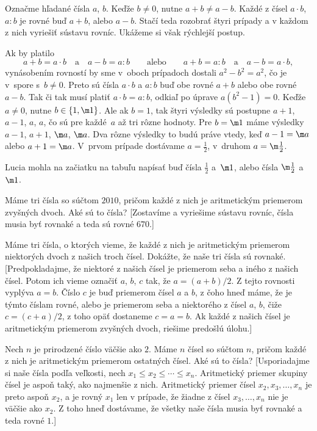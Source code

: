 {%
Označme hľadané čísla $a$, $b$. Keďže $b\ne0$, nutne $a+b\ne a-b$. Každé
z čísel $a\cdot b$, $a:b$ je rovné buď $a+b$, alebo $a-b$. Stačí teda
rozobrať štyri prípady a v každom z nich vyriešiť sústavu rovníc. Ukážeme si však rýchlejší postup.

Ak by platilo
$$
a+b=a\cdot b\quad\text{a}\quad a-b=a:b\qquad\text{alebo}\qquad a+b=a:b\quad\text{a}\quad a-b=a\cdot b,
$$
vynásobením rovností by sme v~oboch prípadoch dostali $a^2-b^2=a^2$, čo je v~spore s~$b\ne0$.
Preto sú čísla $a\cdot b$ a $a:b$ buď obe rovné $a+b$ alebo obe rovné $a-b$. Tak či tak musí platiť $a\cdot b=a:b$, odkiaľ po úprave $a(b^2-1)=0$.
Keďže $a\ne0$, nutne $b\in\{1,\m1\}$. Ale ak $b=1$, tak štyri výsledky sú postupne $a+1$, $a-1$, $a$, $a$,
čo sú pre každé~$a$ až tri rôzne hodnoty. Pre $b=\m1$ máme výsledky $a-1$, $a+1$, $\m a$, $\m a$.
Dva rôzne výsledky to budú práve vtedy, keď $a-1=\m a$ alebo $a+1=\m a$. V~prvom prípade dostávame $a=\frac12$, v~druhom $a=\m\frac12$.

Lucia mohla na začiatku na tabuľu napísať buď čísla $\frac12$ a~$\m1$, alebo čísla $\m\frac12$ a~$\m1$.

Máme tri čísla so súčtom $2010$, pričom každé z nich je aritmetickým priemerom zvyšných dvoch.
Aké sú to čísla?
[Zostavíme a vyriešime sústavu rovníc, čísla musia byť rovnaké a teda sú rovné $670$.]

Máme tri čísla, o ktorých vieme, že každé z nich je aritmetickým priemerom niektorých dvoch
z našich troch čísel. Dokážte, že naše tri čísla sú rovnaké.
[Predpokladajme, že niektoré z našich čísel je priemerom seba a iného z našich čísel. Potom ich vieme
označiť $a$, $b$, $c$ tak, že $a = (a+b)/2$. Z tejto rovnosti vyplýva $a=b$. Číslo $c$ je buď priemerom
čísel $a$ a $b$, z čoho hneď máme, že je týmto číslam rovné, alebo je priemerom seba a niektorého
z čísel $a$, $b$, čiže $c = (c+a)/2$, z toho opäť dostaneme $c=a=b$. Ak každé z našich čísel je
aritmetickým priemerom zvyšných dvoch, riešime predošlú úlohu.]

\D
Nech $n$ je prirodzené číslo väčšie ako $2$. Máme $n$ čísel so súčtom $n$, pričom každé z nich je aritmetickým priemerom
ostatných čísel. Aké sú to čísla?
[Usporiadajme si naše čísla podľa veľkosti, nech $x_1\le x_2\le \cdots\le x_n$. Aritmetický priemer
skupiny čísel je aspoň taký, ako najmenšie z nich. Aritmetický priemer
čísel $x_2, x_3, \dots, x_n$ je preto aspoň $x_2$, a je rovný $x_1$ len v prípade,
že žiadne z čísel $x_3,\dots,x_n$ nie je väčšie ako $x_2$. Z toho hneď dostávame,
že všetky naše čísla musia byť rovnaké a teda rovné $1$.]
}

